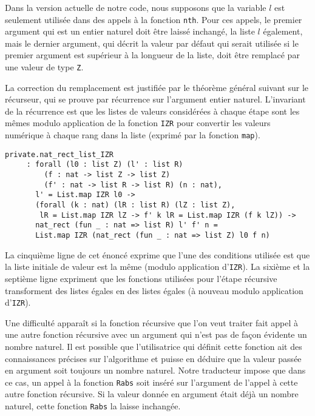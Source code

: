 \documentclass{jflart}
\begin{document}
Dans la version actuelle de notre code, nous supposons que la variable \(l\) est
seulement utilisée dans des appels à la fonction \texttt{nth}.  Pour ces
appels, le premier argument qui est un entier naturel doit être laissé
inchangé, la liste \(l\) également, mais le dernier argument, qui
décrit la valeur par défaut qui serait utilisée si le premier
argument est supérieur à la longueur de la liste, doit être remplacé
par une valeur de type \texttt{Z}.

La correction du remplacement est justifiée par le théorème général
suivant sur le récurseur, qui se prouve par récurrence sur l'argument
entier naturel.  L'invariant de la récurrence est que les listes de
valeurs considérées à chaque étape sont les mêmes modulo application de
la fonction \texttt{IZR} pour convertir les valeurs numérique à chaque
rang dans la liste (exprimé par la fonction \texttt{map}).

\begin{verbatim}
private.nat_rect_list_IZR
     : forall (l0 : list Z) (l' : list R) 
         (f : nat -> list Z -> list Z)
         (f' : nat -> list R -> list R) (n : nat),
       l' = List.map IZR l0 ->
       (forall (k : nat) (lR : list R) (lZ : list Z),
        lR = List.map IZR lZ -> f' k lR = List.map IZR (f k lZ)) ->
       nat_rect (fun _ : nat => list R) l' f' n =
       List.map IZR (nat_rect (fun _ : nat => list Z) l0 f n)
\end{verbatim}
La cinquième ligne de cet énoncé exprime que l'une des conditions utilisée
est que la liste initiale de valeur est la même (modulo application
d'\texttt{IZR}).
La sixième et la septième ligne expriment que les fonctions
utilisées pour l'étape récursive transforment des listes
égales en des listes égales (à nouveau modulo application
d'\texttt{IZR}).

Une difficulté apparaît si la fonction récursive que l'on veut traiter
fait appel à une autre fonction récursive avec un argument qui n'est
pas de façon évidente un nombre naturel.  Il est possible que
l'utilisatrice qui définit cette fonction ait des connaissances
précises sur l'algorithme et puisse en déduire que la valeur passée
en argument soit toujours un nombre naturel.  Notre traducteur impose
que dans ce cas, un appel à la fonction \texttt{Rabs} soit inséré sur
l'argument de l'appel à cette autre fonction récursive.  Si la valeur
donnée en argument était déjà un nombre naturel, cette fonction
\texttt{Rabs} la laisse inchangée.
\end{document}
